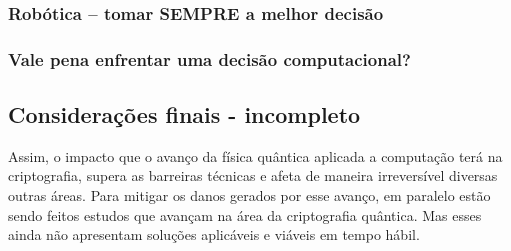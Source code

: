 \subsubsection{Robótica – tomar SEMPRE a melhor decisão}
\subsubsection{Vale pena enfrentar uma decisão computacional?}

\subsection{Considerações finais - incompleto}
Assim, o impacto que o avanço da física quântica aplicada a computação terá na criptografia, supera as barreiras técnicas e afeta de maneira irreversível diversas outras áreas. Para mitigar os danos gerados por esse avanço, em paralelo estão sendo feitos estudos que avançam na área da criptografia quântica. Mas esses ainda não apresentam soluções aplicáveis e viáveis em tempo hábil.

\newpage
